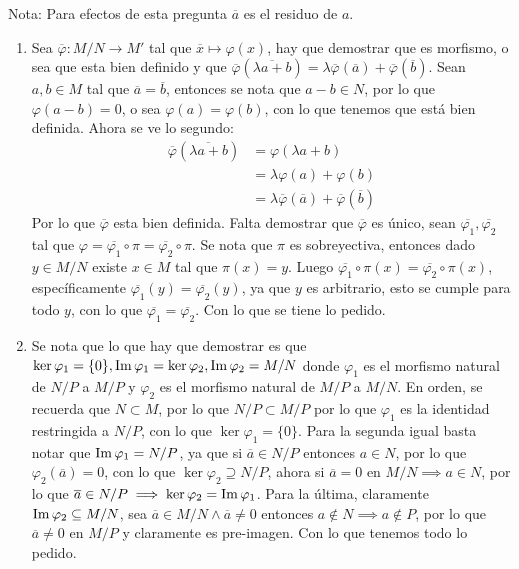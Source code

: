 \begin{sol}{2.49}
    Nota: Para efectos de esta pregunta \(\overline{a}\) es el residuo de \(a\).
    \begin{enumerate}
        \item Sea \(\overline{\varphi}:M/N\rightarrow M'\) tal que \(\overline{x}\mapsto \varphi(x)\), hay que demostrar que es morfismo, o sea que esta bien definido y que \(\overline{\varphi}(\overline{\lambda a+b})=\lambda\overline{\varphi}(\overline{a})+\overline{\varphi}(\overline{b})\). Sean \(a,b\in M\) tal que \(\overline{a}=\overline{b}\), entonces se nota que \(a-b\in N\), por lo que \(\varphi(a-b)=0\), o sea \(\varphi(a)=\varphi(b)\), con lo que tenemos que está bien definida. Ahora se ve lo segundo:
              \begin{align*}
                  \overline{\varphi}(\overline{\lambda a+b}) & = \varphi(\lambda a+b)                                                     \\
                                                             & =\lambda\varphi(a)+\varphi(b)                                              \\
                                                             & =\lambda \overline{\varphi}(\overline{a})+\overline{\varphi}(\overline{b})
              \end{align*}
              Por lo que \(\overline{\varphi}\) esta bien definida. Falta demostrar que \(\overline{\varphi}\) es único, sean \(\overline{\varphi_1},\overline{\varphi_2}\) tal que \(\varphi=\overline{\varphi_1}\circ\pi=\overline{\varphi_2}\circ\pi\). Se nota que \(\pi\) es sobreyectiva, entonces dado \(y\in M/N\) existe \(x\in M\) tal que \(\pi(x)=y\). Luego \(\overline{\varphi_1}\circ\pi(x)=\overline{\varphi_2}\circ\pi(x)\), específicamente \(\overline{\varphi_1}(y)=\overline{\varphi_2}(y)\), ya que \(y\) es arbitrario, esto se cumple para todo \(y\), con lo que \(\overline{\varphi_1}=\overline{\varphi_2}\). Con lo que se tiene lo pedido.
        \item Se nota que lo que hay que demostrar es que \(\ker\varphi_1=\{0\},\operatorname{Im}\varphi_1=\ker\varphi_2,\operatorname{Im}\varphi_2=M/N\) donde \(\varphi_1\) es el morfismo natural de \(N/P\) a \(M/P\) y \(\varphi_2\) es el morfismo natural de \(M/P\) a \(M/N\). En orden, se recuerda que \(N\subset M\), por lo que \(N/P\subset M/P\) por lo que \(\varphi_1\) es la identidad restringida a \(N/P\), con lo que \(\ker\varphi_1=\{0\}\). Para la segunda igual basta notar que \(\operatorname{Im}\varphi_1=N/P\), ya que si \(\overline{a}\in N/P\) entonces \(a\in N\), por lo que \(\varphi_2(\overline{a})=0\), con lo que \(\ker\varphi_2\supseteq N/P\), ahora si \(\overline{a}=0\) en \(M/N \implies a\in N\), por lo que \(\overline{a}\in N/P\implies \ker\varphi_2=\operatorname{Im}\varphi_1\). Para la última, claramente \(\operatorname{Im}\varphi_2\subseteq M/N\), sea \(\overline{a}\in M/N\wedge\overline{a}\neq 0\) entonces \(a\notin N\implies a\notin P\), por lo que \(\overline{a}\neq 0\) en \(M/P\) y claramente es pre-imagen. Con lo que tenemos todo lo pedido.

\end{enumerate}
\end{sol}
